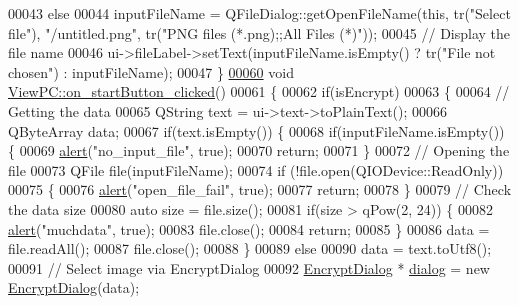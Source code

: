 \begin{DoxyCode}
00043     \textcolor{keywordflow}{else}
00044         inputFileName = QFileDialog::getOpenFileName(\textcolor{keyword}{this}, tr(\textcolor{stringliteral}{"Select file"}), \textcolor{stringliteral}{"/untitled.png"}, tr(\textcolor{stringliteral}{"PNG
       files (*.png);;All Files (*)"}));
00045     \textcolor{comment}{// Display the file name}
00046     ui->fileLabel->setText(inputFileName.isEmpty() ? tr(\textcolor{stringliteral}{"File not chosen"}) : inputFileName);
00047 \}
\hypertarget{viewpc_8cpp_source.tex_l00060}{}\hyperlink{class_view_p_c_a456d75b7c5d3a089302a576e7359f1f4}{00060} \textcolor{keywordtype}{void} \hyperlink{class_view_p_c_a456d75b7c5d3a089302a576e7359f1f4}{ViewPC::on\_startButton\_clicked}()
00061 \{
00062     \textcolor{keywordflow}{if}(isEncrypt)
00063     \{
00064         \textcolor{comment}{// Getting the data}
00065         QString text = ui->text->toPlainText();
00066         QByteArray data;
00067         \textcolor{keywordflow}{if}(text.isEmpty()) \{
00068             \textcolor{keywordflow}{if}(inputFileName.isEmpty()) \{
00069                 \hyperlink{class_view_p_c_a7c467169467789561078abc9d4fe57bd}{alert}(\textcolor{stringliteral}{"no\_input\_file"}, \textcolor{keyword}{true});
00070                 \textcolor{keywordflow}{return};
00071             \}
00072             \textcolor{comment}{// Opening the file}
00073             QFile file(inputFileName);
00074             \textcolor{keywordflow}{if} (!file.open(QIODevice::ReadOnly))
00075             \{
00076                 \hyperlink{class_view_p_c_a7c467169467789561078abc9d4fe57bd}{alert}(\textcolor{stringliteral}{"open\_file\_fail"}, \textcolor{keyword}{true});
00077                 \textcolor{keywordflow}{return};
00078             \}
00079             \textcolor{comment}{// Check the data size}
00080             \textcolor{keyword}{auto} size = file.size();
00081             \textcolor{keywordflow}{if}(size > qPow(2, 24)) \{
00082                 \hyperlink{class_view_p_c_a7c467169467789561078abc9d4fe57bd}{alert}(\textcolor{stringliteral}{"muchdata"}, \textcolor{keyword}{true});
00083                 file.close();
00084                 \textcolor{keywordflow}{return};
00085             \}
00086             data = file.readAll();
00087             file.close();
00088         \}
00089         \textcolor{keywordflow}{else}
00090             data = text.toUtf8();
00091         \textcolor{comment}{// Select image via EncryptDialog}
00092         \hyperlink{class_encrypt_dialog}{EncryptDialog} * \hyperlink{class_view_p_c_a31abbb470fe329b44e6ffee202b903ca}{dialog} = \textcolor{keyword}{new} \hyperlink{class_encrypt_dialog}{EncryptDialog}(data);

\end{DoxyCode}
